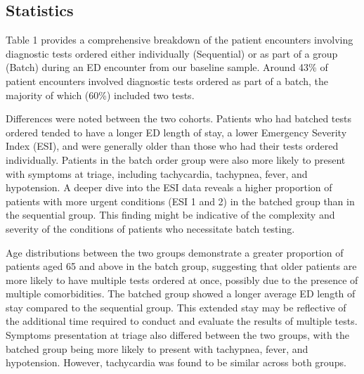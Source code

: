 \documentclass[,,nonblindrev]{informs}
\begin{document}
\hypertarget{statistics}{%
\subsection{Statistics}\label{statistics}}

Table 1 provides a comprehensive breakdown of the patient encounters
involving diagnostic tests ordered either individually (Sequential) or
as part of a group (Batch) during an ED encounter from our baseline
sample. Around 43\% of patient encounters involved diagnostic tests
ordered as part of a batch, the majority of which (60\%) included two
tests.

Differences were noted between the two cohorts. Patients who had batched
tests ordered tended to have a longer ED length of stay, a lower
Emergency Severity Index (ESI), and were generally older than those who
had their tests ordered individually. Patients in the batch order group
were also more likely to present with symptoms at triage, including
tachycardia, tachypnea, fever, and hypotension. A deeper dive into the
ESI data reveals a higher proportion of patients with more urgent
conditions (ESI 1 and 2) in the batched group than in the sequential
group. This finding might be indicative of the complexity and severity
of the conditions of patients who necessitate batch testing.

Age distributions between the two groups demonstrate a greater
proportion of patients aged 65 and above in the batch group, suggesting
that older patients are more likely to have multiple tests ordered at
once, possibly due to the presence of multiple comorbidities. The
batched group showed a longer average ED length of stay compared to the
sequential group. This extended stay may be reflective of the additional
time required to conduct and evaluate the results of multiple tests.
Symptoms presentation at triage also differed between the two groups,
with the batched group being more likely to present with tachypnea,
fever, and hypotension. However, tachycardia was found to be similar
across both groups.
\end{document}
